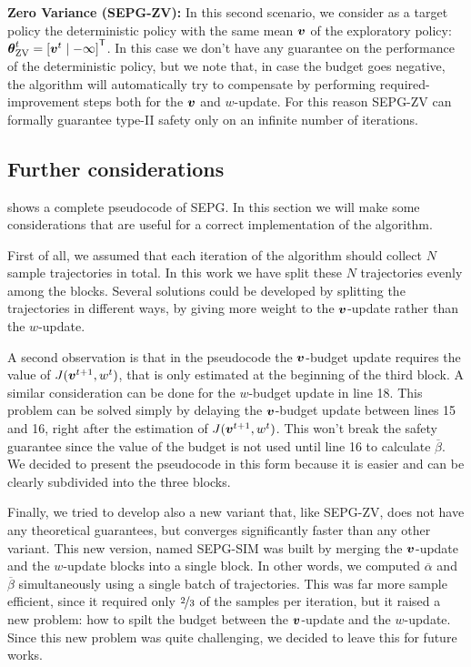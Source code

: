\textbf{Zero Variance (SEPG-ZV):} In this second scenario, we consider as a target policy the deterministic policy with the same mean $\boldsymbol{v}$ of the exploratory policy: ${\boldsymbol{\theta}}^t_{\text{ZV}} = {[\boldsymbol{v}^t \mid -\infty]}^{\mathsf{T}}$. In this case we don't have any guarantee on the performance of the deterministic policy, but we note that, in case the budget goes negative, the algorithm will automatically  try to compensate by performing required-improvement steps both for the $\boldsymbol{v}$ and $w$-update. For this reason SEPG-ZV can formally guarantee type-II safety only on an infinite number of iterations. 




\subsection{Further considerations}
 shows a complete pseudocode of SEPG. In this section we will make some considerations that are useful for a correct implementation of the algorithm.

First of all, we assumed that each iteration of the algorithm should collect $N$ sample trajectories in total. In this work we have split these $N$ trajectories evenly among the blocks. Several solutions could be developed by splitting the trajectories in different ways, \eg by giving more weight to the $\boldsymbol{v}$-update rather than the $w$-update.

A second observation is that in the pseudocode the $\boldsymbol{v}$-budget update requires the value of $J(\boldsymbol{v}^{t+1}, w^t)$, that is only estimated at the beginning of the third block. A similar consideration can be done for the $w$-budget update in line 18. This problem can be solved simply by delaying the $\boldsymbol{v}$-budget update between lines 15 and 16, right after the estimation of $J(\boldsymbol{v}^{t+1}, w^t)$. This won't break the safety guarantee since the value of the budget is not used until line 16 to calculate $\overline{\beta}$. We decided to present the pseudocode in this form because it is easier and can be clearly subdivided into the three blocks.

Finally, we tried to develop also a new variant that, like SEPG-ZV, does not have any theoretical guarantees, but converges significantly faster than any other variant. This new version, named SEPG-SIM was built by merging the $\boldsymbol{v}$-update and the $w$-update blocks into a single block. In other words, we computed $\overline{\alpha}$ and $\overline{\beta}$ simultaneously using a single batch of trajectories. This was far more sample efficient, since it required only $\nicefrac{2}{3}$ of the samples per iteration, but it raised a new problem: how to spilt the budget between the $\boldsymbol{v}$-update and the $w$-update. Since this new problem was quite challenging, we decided to leave this for future works.


